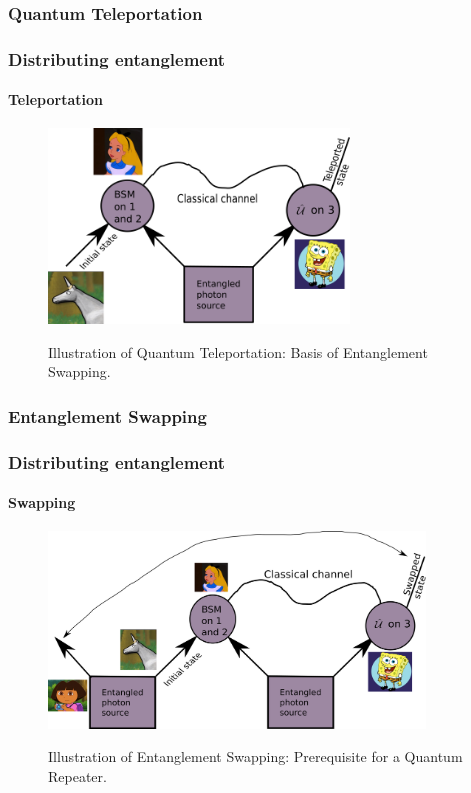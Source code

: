 \documentclass[serif,8pt]{beamer}
\begin{document}
\subsubsection{Quantum Teleportation}
\begin{frame}[t]
    \frametitle{Distributing entanglement}
    \framesubtitle{Teleportation}
    \begin{figure}[]
      \centering
      \caption{Illustration of Quantum Teleportation: Basis of Entanglement Swapping.}
      \includegraphics[width=8cm]{EntanglementTeleportation.png}
	\label{fig:Tele}
    \end{figure}
\end{frame}



\subsubsection{Entanglement Swapping}
\begin{frame}[t]
    \frametitle{Distributing entanglement}
    \framesubtitle{Swapping}
\begin{figure}[]
      \centering
      \caption{Illustration of Entanglement Swapping: Prerequisite for a Quantum Repeater.}
      \includegraphics[width=10cm]{EntanglementSwapping.png}
	\label{fig:Swap}
    \end{figure}
\end{frame}
\end{document}
